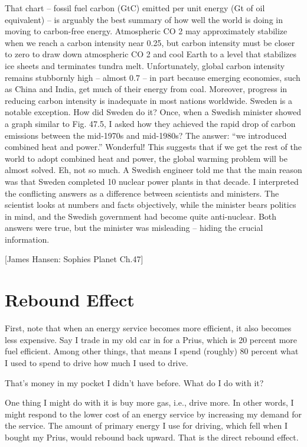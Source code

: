 \documentclass[
]{book}
\begin{document}
That chart -- fossil fuel carbon (GtC) emitted per
unit energy (Gt of oil equivalent) -- is arguably the best summary of how well the world is doing
in moving to carbon-free energy. Atmospheric CO 2 may approximately stabilize when we reach
a carbon intensity near 0.25, but carbon intensity must be closer to zero to draw down
atmospheric CO 2 and cool Earth to a level that stabilizes ice sheets and terminates tundra melt.
Unfortunately, global carbon intensity remains stubbornly high -- almost 0.7 -- in part because
emerging economies, such as China and India, get much of their energy from coal. Moreover,
progress in reducing carbon intensity is inadequate in most nations worldwide.
Sweden is a notable exception. How did Sweden do it? Once, when a Swedish minister showed
a graph similar to Fig. 47.5, I asked how they achieved the rapid drop of carbon emissions
between the mid-1970s and mid-1980s? The answer: ``we introduced combined heat and
power.'' Wonderful! This suggests that if we get the rest of the world to adopt combined heat
and power, the global warming problem will be almost solved.
Eh, not so much. A Swedish engineer told me that the main reason was that Sweden completed
10 nuclear power plants in that decade. I interpreted the conflicting answers as a difference
between scientists and ministers. The scientist looks at numbers and facts objectively, while the
minister bears politics in mind, and the Swedish government had become quite anti-nuclear.
Both answers were true, but the minister was misleading -- hiding the crucial information.

{[}James Hansen: Sophies Planet Ch.47{]}

\hypertarget{rebound-effect-1}{%
\chapter{Rebound Effect}\label{rebound-effect-1}}

First, note that when an energy service becomes more efficient, it also becomes less expensive. Say I trade in my old car in for a Prius, which is 20 percent more fuel efficient. Among other things, that means I spend (roughly) 80 percent what I used to spend to drive how much I used to drive.

That's money in my pocket I didn't have before. What do I do with it?

One thing I might do with it is buy more gas, i.e., drive more. In other words, I might respond to the lower cost of an energy service by increasing my demand for the service. The amount of primary energy I use for driving, which fell when I bought my Prius, would rebound back upward. That is the direct rebound effect.
\end{document}
